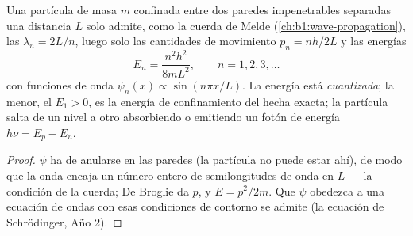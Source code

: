 \begin{proposition}\label{prop:b1:quantum-introduction:box}
Una partícula de masa $m$ confinada entre dos paredes impenetrables
separadas una distancia $L$ solo admite, como la cuerda de Melde
(\cref{ch:b1:wave-propagation}), las  $\lambda_n = 2L/n$,
luego solo las cantidades de movimiento $p_n = nh/2L$ y las energías
\[
E_n = \frac{n^2h^2}{8mL^2} , \qquad n = 1, 2, 3, \ldots
\]
con funciones de onda $\psi_n(x) \propto \sin(n\pi x/L)$. La energía está
\emph{cuantizada}; la menor, el \emph{} $E_1 > 0$, es la
energía de confinamiento del  hecha exacta;
la partícula salta de un nivel a otro absorbiendo o emitiendo un fotón
de energía $h\nu = E_p - E_n$.
\end{proposition}

\begin{proof}
$\psi$ ha de anularse en las paredes (la partícula no puede estar ahí),
de modo que la onda encaja un número entero de semilongitudes de onda en
$L$ --- la condición de la cuerda; De Broglie da $p$, y $E = p^2/2m$. Que
$\psi$ obedezca a una ecuación de ondas con esas condiciones de contorno
se admite (la ecuación de Schrödinger, Año 2).
\end{proof}


